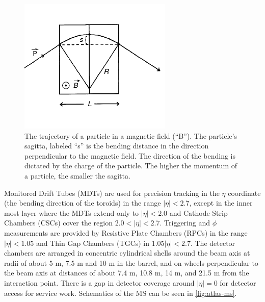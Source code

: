 \begin{figure}[!h]
\centering
\includegraphics[width=.6\textwidth]{figures/Detector/ms-sagitta.png}
\caption{The trajectory of a particle in a magnetic field (``B''). The particle's sagitta, labeled ``s'' is the bending distance in the direction perpendicular to the magnetic field. The direction of the bending is dictated by the charge of the particle. The higher the momentum of a particle, the smaller the sagitta. \cite{particledetectors-springer}}
\label{fig:ms-sagitta}
\end{figure}


Monitored Drift Tubes (MDTs) are used for precision tracking in the $\eta$ coordinate (the bending direction of the toroids) in the range $|\eta| < 2.7$, except in the inner most layer where the \ac{MDT}s extend only to $|\eta| < 2.0$ and Cathode-Strip Chambers (CSCs) cover the region $2.0 < |\eta| < 2.7$. Triggering and $\phi$ measurements are provided by Resistive Plate Chambers (RPCs) in the range $|\eta| < 1.05$ and Thin Gap Chambers (TGCs) in $1.05 |\eta| < 2.7$. The detector chambers are arranged in concentric cylindrical shells around the beam axis at radii of about 5 m, 7.5 m and 10 m in the barrel, and on wheels perpendicular to the beam axis at distances of about 7.4 m, 10.8 m, 14 m, and 21.5 m from the interaction point. There is a gap in detector coverage around $|\eta| = 0$ for detector access for service work. Schematics of the \ac{MS} can be seen in \autoref{fig:atlas-ms}.  

